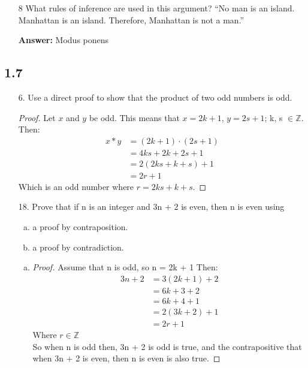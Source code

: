\begin{itemize}
    \item[8] What rules of inference are used in this argument? “No man is an island. Manhattan is an island. Therefore, Manhattan is not a man.”

          \textbf{Answer:} Modus ponens
\end{itemize}

\subsection{1.7}
\begin{itemize}
    \item[6.] Use a direct proof to show that the product of two odd numbers is odd.
          \begin{proof}
              Let $x$ and $y$ be odd. This means that $x = 2k + 1$, $y = 2s + 1$; k, s $\in\mathbb{Z}$. \\
              Then:
              \begin{align*}
                  x*y & = (2k + 1) \cdot (2s+1) \\
                      & = 4ks + 2k + 2s + 1     \\
                      & = 2(2ks + k + s) + 1    \\
                      & = 2r + 1
              \end{align*}
              Which is an odd number where $r = 2ks + k + s$.
          \end{proof}

    \item[18.] Prove that if n is an integer and 3n + 2 is even, then n is even using
          \begin{enumerate}[a.]
              \item a proof by contraposition.
              \item a proof by contradiction.
          \end{enumerate}
          \begin{enumerate}[a.]
              \item
                    \begin{proof}
                        Assume that n is odd, so n = 2k  + 1
                        Then:
                        \begin{align*}
                            3n + 2 & = 3(2k + 1)  + 2 \\
                                   & = 6k + 3 + 2     \\
                                   & = 6k + 4 + 1     \\
                                   & = 2(3k + 2) + 1  \\
                                   & = 2r + 1
                        \end{align*}
                        Where $r \in \mathbb{Z}$\\
                        So when n is odd then, 3n + 2 is odd is true, and the contrapositive that when 3n + 2 is even, then n is even is also true.
                    \end{proof}


\end{enumerate}
\end{itemize}
